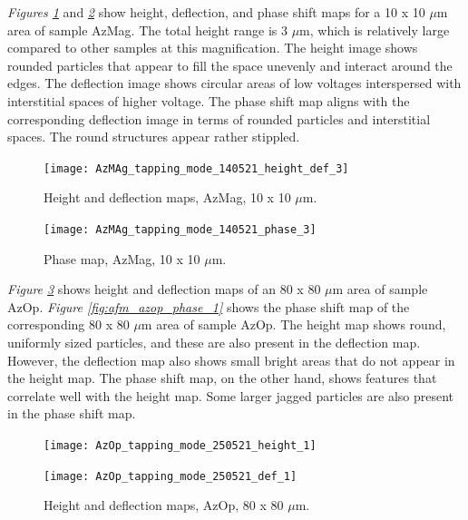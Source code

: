 \textit{Figures \ref{fig:afm_azmag_height_def_9}} and \textit{\ref{fig:afm_azmag_phase_9}} show height, deflection, and phase shift maps for a 10 x 10 $\mu$m area of sample AzMag. The total height range is 3 $\mu$m, which is relatively large compared to other samples at this magnification. The height image shows rounded particles that appear to fill the space unevenly and interact around the edges. The deflection image shows circular areas of low voltages interspersed with interstitial spaces of higher voltage. The phase shift map aligns with the corresponding deflection image in terms of rounded particles and interstitial spaces. The round structures appear rather stippled.

\begin{figure}[H]
\centering
  \texttt{[image: AzMAg\_tapping\_mode\_140521\_height\_def\_3]}
\caption[Height and deflection maps, AzMag]{Height and deflection maps, AzMag, 10 x 10 $\mu$m.}
\label{fig:afm_azmag_height_def_9}
\end{figure}

\begin{figure}[H]
\centering
  \texttt{[image: AzMAg\_tapping\_mode\_140521\_phase\_3]}
\caption[Phase map, AzMag]{Phase map, AzMag, 10 x 10 $\mu$m.}
\label{fig:afm_azmag_phase_9}
\end{figure}



\textit{Figure \ref{fig:afm_azop_height_def_1}} shows height and deflection maps of an 80 x 80 $\mu$m area of sample AzOp. \textit{Figure \ref{fig:afm_azop_phase_1}} shows the phase shift map of the corresponding 80 x 80 $\mu$m area of sample AzOp. The height map shows round, uniformly sized particles, and these are also present in the deflection map. However, the deflection map also shows small bright areas that do not appear in the height map. The phase shift map, on the other hand, shows features that correlate well with the height map. Some larger jagged particles are also present in the phase shift map.

\begin{figure}[H]
\centering
\begin{minipage}{.45\textwidth}
  \centering
  \texttt{[image: AzOp\_tapping\_mode\_250521\_height\_1]}
\end{minipage}
\begin{minipage}{.45\textwidth}
  \centering
  \texttt{[image: AzOp\_tapping\_mode\_250521\_def\_1]}
\end{minipage}
\caption[Height and deflection maps, AzOp]{Height and deflection maps, AzOp, 80 x 80 $\mu$m.}
\label{fig:afm_azop_height_def_1}
\end{figure}

